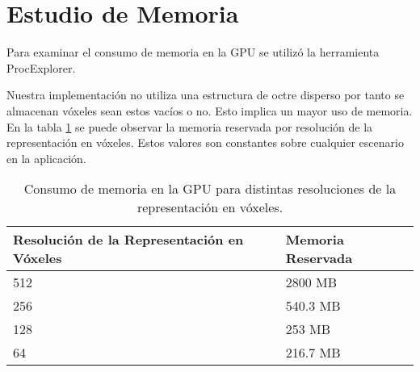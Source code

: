 \section{Estudio de Memoria}
Para examinar el consumo de memoria en la \ac{GPU} se utilizó la herramienta ProcExplorer.

Nuestra implementación no utiliza una estructura de octre disperso por tanto se almacenan vóxeles sean estos vacíos o no. Esto implica un mayor uso de memoria. En la tabla \ref{tab:memory} se puede observar la memoria reservada por resolución de la representación en vóxeles. Estos valores son constantes sobre cualquier escenario en la aplicación.

\begin{table}[h]
\centering
\begin{tabular}{ll}
Resolución de la Representación en Vóxeles & Memoria Reservada             \\ \hline
\multicolumn{1}{|l|}{512}                  & \multicolumn{1}{l|}{2800 MB}  \\
\multicolumn{1}{|l|}{256}                  & \multicolumn{1}{l|}{540.3 MB} \\
\multicolumn{1}{|l|}{128}                  & \multicolumn{1}{l|}{253 MB}   \\
\multicolumn{1}{|l|}{64}                   & \multicolumn{1}{l|}{216.7 MB} \\ \hline
\end{tabular}
\caption{Consumo de memoria en la \ac{GPU} para distintas resoluciones de la representación en vóxeles.}
\label{tab:memory}
\end{table}
